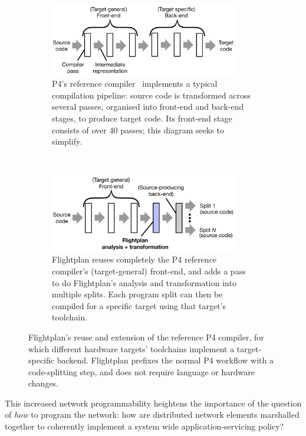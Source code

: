 \documentclass[letterpaper,twocolumn,10pt]{article}
\begin{document}
\begin{figure}[t!]
\centering
\begin{subfigure}[t]{0.5\textwidth}
\centering
\includegraphics[width=0.9\textwidth]{compilation_overview.pdf}
\caption{P4's reference compiler~\cite{p4c} implements a typical
compilation pipeline: source code is transformed across several
passes, organised into front-end and back-end stages, to produce
target code. Its front-end stage consists of over 40 passes; this
diagram seeks to simplify.}
\label{fig:compilation:overview}
\end{subfigure}%
~
\begin{subfigure}[t]{0.5\textwidth}
\centering
\includegraphics[width=0.9\textwidth]{compilation_flightplan.pdf}
\caption{Flightplan reuses completely the P4 reference compiler's
(target-general) front-end, and adds a pass to do Flightplan's
analysis and transformation into multiple splits. Each program split
can then be compiled for a specific target using that target's toolchain.}
\label{fig:compilation:flightplan}
\end{subfigure}
\caption{Flightplan's reuse and extension of the reference P4
compiler, for which different hardware targets' toolchains implement a
target-specific backend. Flightplan prefixes the normal P4
workflow with a code-splitting step, and does not require language or hardware changes.}
\end{figure}

This increased network programmability heightens the importance of the question
of \emph{how} to program the network: how are distributed network elements
marshalled together to coherently implement a system wide application-servicing
policy?
\end{document}
